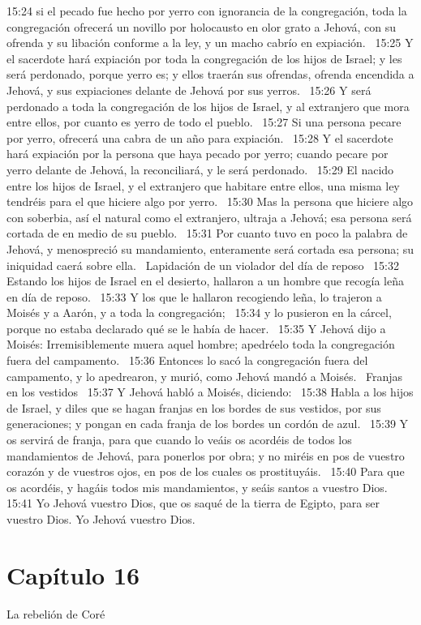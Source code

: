 15:24 si el pecado fue hecho por yerro con ignorancia de la congregación, toda la congregación ofrecerá un novillo por holocausto en olor grato a Jehová, con su ofrenda y su libación conforme a la ley, y un macho cabrío en expiación.  
15:25 Y el sacerdote hará expiación por toda la congregación de los hijos de Israel; y les será perdonado, porque yerro es; y ellos traerán sus ofrendas, ofrenda encendida a Jehová, y sus expiaciones delante de Jehová por sus yerros.  
15:26 Y será perdonado a toda la congregación de los hijos de Israel, y al extranjero que mora entre ellos, por cuanto es yerro de todo el pueblo.  
15:27 Si una persona pecare por yerro, ofrecerá una cabra de un año para expiación.  
15:28 Y el sacerdote hará expiación por la persona que haya pecado por yerro; cuando pecare por yerro delante de Jehová, la reconciliará, y le será perdonado.  
15:29 El nacido entre los hijos de Israel, y el extranjero que habitare entre ellos, una misma ley tendréis para el que hiciere algo por yerro.  
15:30 Mas la persona que hiciere algo con soberbia, así el natural como el extranjero, ultraja a Jehová; esa persona será cortada de en medio de su pueblo.  
15:31 Por cuanto tuvo en poco la palabra de Jehová, y menospreció su mandamiento, enteramente será cortada esa persona; su iniquidad caerá sobre ella.  
Lapidación de un violador del día de reposo  
15:32 Estando los hijos de Israel en el desierto, hallaron a un hombre que recogía leña en día de reposo.  
15:33 Y los que le hallaron recogiendo leña, lo trajeron a Moisés y a Aarón, y a toda la congregación;  
15:34 y lo pusieron en la cárcel, porque no estaba declarado qué se le había de hacer.  
15:35 Y Jehová dijo a Moisés: Irremisiblemente muera aquel hombre; apedréelo toda la congregación fuera del campamento.  
15:36 Entonces lo sacó la congregación fuera del campamento, y lo apedrearon, y murió, como Jehová mandó a Moisés.  
Franjas en los vestidos  
15:37 Y Jehová habló a Moisés, diciendo:  
15:38 Habla a los hijos de Israel, y diles que se hagan franjas en los bordes de sus vestidos, por sus generaciones; y pongan en cada franja de los bordes un cordón de azul.  
15:39 Y os servirá de franja, para que cuando lo veáis os acordéis de todos los mandamientos de Jehová, para ponerlos por obra; y no miréis en pos de vuestro corazón y de vuestros ojos, en pos de los cuales os prostituyáis.  
15:40 Para que os acordéis, y hagáis todos mis mandamientos, y seáis santos a vuestro Dios.  
15:41 Yo Jehová vuestro Dios, que os saqué de la tierra de Egipto, para ser vuestro Dios. Yo Jehová vuestro Dios.  
\section*{Capítulo 16 }
La rebelión de Coré  

